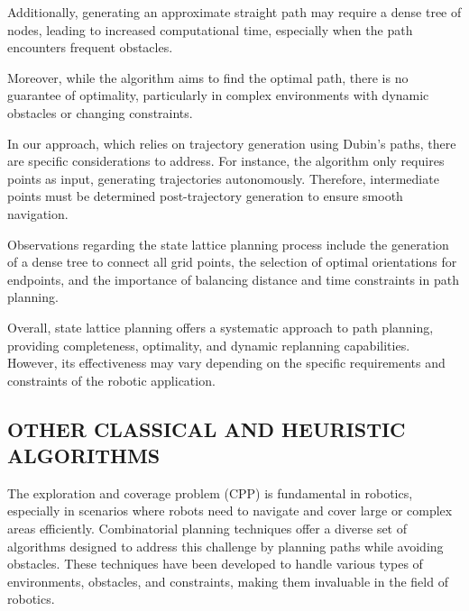 \vspace*{6mm}

Additionally, generating an approximate straight path may require a dense tree of nodes, leading to increased computational time, especially when the path encounters frequent obstacles.

\vspace*{6mm}

Moreover, while the algorithm aims to find the optimal path, there is no guarantee of optimality, particularly in complex environments with dynamic obstacles or changing constraints.

\vspace*{6mm}

In our approach, which relies on trajectory generation using Dubin's paths, there are specific considerations to address. For instance, the algorithm only requires points as input, generating trajectories autonomously. Therefore, intermediate points must be determined post-trajectory generation to ensure smooth navigation.

\vspace*{6mm}

Observations regarding the state lattice planning process include the generation of a dense tree to connect all grid points, the selection of optimal orientations for endpoints, and the importance of balancing distance and time constraints in path planning.

\vspace*{6mm}

Overall, state lattice planning offers a systematic approach to path planning, providing completeness, optimality, and dynamic replanning capabilities. However, its effectiveness may vary depending on the specific requirements and constraints of the robotic application.


\subsection{OTHER CLASSICAL AND HEURISTIC ALGORITHMS}

The exploration and coverage problem (CPP) is fundamental in robotics, especially in scenarios where robots need to navigate and cover large or complex areas efficiently. Combinatorial planning techniques offer a diverse set of algorithms designed to address this challenge by planning paths while avoiding obstacles. These techniques have been developed to handle various types of environments, obstacles, and constraints, making them invaluable in the field of robotics.

